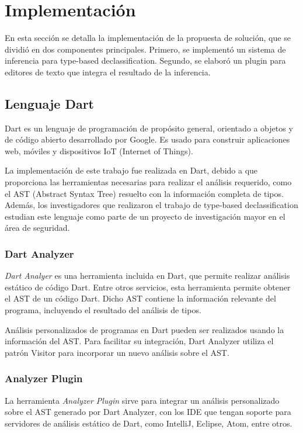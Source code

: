 \chapter{Implementación}
En esta sección se detalla la implementación de la propuesta de solución, que se dividió en dos componentes principales. Primero, se implementó un sistema de inferencia para type-based declassification. Segundo, se elaboró un plugin para editores de texto que integra el resultado de la inferencia.

\section{Lenguaje Dart}
Dart es un lenguaje de programación de propósito general, orientado a objetos y de código abierto desarrollado por Google. Es usado para construir aplicaciones web, móviles y dispositivos IoT (Internet of Things).

La implementación de este trabajo fue realizada en Dart, debido a que proporciona las herramientas necesarias para realizar el análisis requerido, como el AST (Abstract Syntax Tree) resuelto con la información completa de tipos. Además, los investigadores que realizaron el trabajo de type-based declassification estudian este lenguaje como parte de un proyecto de investigación mayor en el área de seguridad.

\subsection{Dart Analyzer}
\emph{Dart Analyer} es una herramienta incluida en Dart, que permite realizar análisis estático de código Dart. Entre otros servicios, esta herramienta permite obtener el AST de un código Dart. Dicho AST contiene la información relevante del programa, incluyendo el resultado del análisis de tipos.

Análisis personalizados de programas en Dart pueden ser realizados usando la información del AST. Para facilitar su integración, Dart Analyzer utiliza el patrón Visitor para incorporar un nuevo análisis sobre el AST.

\subsection{Analyzer Plugin}
La herramienta \emph{Analyzer Plugin} sirve para integrar un análisis personalizado sobre el AST generado por Dart Analyzer, con los IDE que tengan soporte para servidores de análisis estático de Dart, como IntelliJ, Eclipse, Atom, entre otros.


